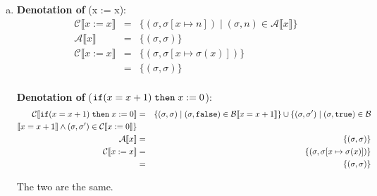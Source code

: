 \documentclass[10pt, oneside]{article}
\begin{document}
\begin{enumerate}[1.]
\begin{enumerate} [(a)]
      $$f_{n+1} = \emptyset \text{ } \checkmark$$ 
      
      Therefore, $P(n)$ hold for all $n \in \mathbb{N}$ and the fixed point of $F'$ 
      is:
      
      $$ \text{fix}(F') = \bigcup_{i \geq 0} F'^{i}(\emptyset) = \emptyset \cup 
      \emptyset \cup ... \cup \emptyset = \emptyset$$

     So, we see that $c_b$ and $c_a$ denote the same mathematical object, and are therefore equal.
      
    \item {\bf Denotation of}  (x := x):
       \begin{eqnarray*}  \mathcal{C} \llbracket x := x \rrbracket & = & \{ (\sigma, \sigma[x \mapsto n]) \mid (\sigma, n) \in \mathcal{A} \llbracket x \rrbracket \} \\
    \mathcal{A} \llbracket x \rrbracket & = & \{ (\sigma, \sigma)\} \\
     \mathcal{C} \llbracket x := x \rrbracket & = & \{ (\sigma, \sigma[x \mapsto \sigma(x)]) \}\\
     & = & \{(\sigma, \sigma)\}\\
   \end{eqnarray*}
   
   
   {\bf Denotation of}   ($\texttt{if} (x = x+1) \hspace{1mm} \texttt{then} \hspace{1mm} x := 0$):
       \begin{eqnarray*}  \mathcal{C} \llbracket \texttt{if} (x = x+1) \hspace{1mm} \texttt{then}\hspace{1mm} x := 0 \rrbracket & = & \{ (\sigma, \sigma) \mid (\sigma, \texttt{false}) \in \mathcal{B} \llbracket x = x + 1 \rrbracket \} \cup \{ (\sigma, \sigma') \mid (\sigma, \texttt{true}) \in \mathcal{B}\\  \llbracket x = x + 1 \rrbracket \wedge (\sigma, \sigma') \in \mathcal{C}\llbracket x := 0 \rrbracket \} \\
    \mathcal{A} \llbracket x \rrbracket & = & \{ (\sigma, \sigma)\} \\
     \mathcal{C} \llbracket x := x \rrbracket & = & \{ (\sigma, \sigma[x \mapsto \sigma(x)]) \}\\
     & = & \{(\sigma, \sigma)\}
   \end{eqnarray*}
   
   The two are the same.

  \end{enumerate}


\end{enumerate}
\end{document}
